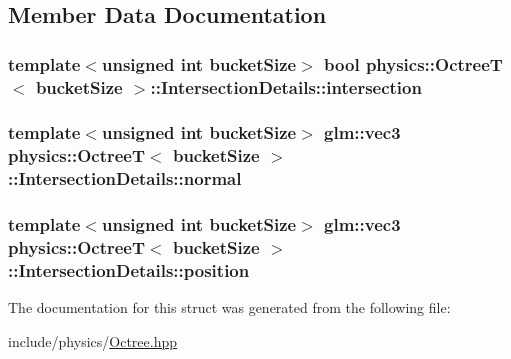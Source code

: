 \subsection{Member Data Documentation}
\hypertarget{structphysics_1_1OctreeT_1_1IntersectionDetails_acd7da41845687dadd2004ab3f849952b}{
\subsubsection[{intersection}]{\setlength{\rightskip}{0pt plus 5cm}template$<$unsigned int bucket\-Size$>$ bool {\bf physics\-::\-Octree\-T}$<$ bucket\-Size $>$\-::Intersection\-Details\-::intersection}}\label{structphysics_1_1OctreeT_1_1IntersectionDetails_acd7da41845687dadd2004ab3f849952b}
\hypertarget{structphysics_1_1OctreeT_1_1IntersectionDetails_a87efb768acda70549ef16a20a5a15681}{
\subsubsection[{normal}]{\setlength{\rightskip}{0pt plus 5cm}template$<$unsigned int bucket\-Size$>$ glm\-::vec3 {\bf physics\-::\-Octree\-T}$<$ bucket\-Size $>$\-::Intersection\-Details\-::normal}}\label{structphysics_1_1OctreeT_1_1IntersectionDetails_a87efb768acda70549ef16a20a5a15681}
\hypertarget{structphysics_1_1OctreeT_1_1IntersectionDetails_a301cd627e77f95090c2aafc202ca9aeb}{
\subsubsection[{position}]{\setlength{\rightskip}{0pt plus 5cm}template$<$unsigned int bucket\-Size$>$ glm\-::vec3 {\bf physics\-::\-Octree\-T}$<$ bucket\-Size $>$\-::Intersection\-Details\-::position}}\label{structphysics_1_1OctreeT_1_1IntersectionDetails_a301cd627e77f95090c2aafc202ca9aeb}


The documentation for this struct was generated from the following file\-:\begin{DoxyCompactItemize}
\item 
include/physics/\hyperlink{Octree_8hpp}{Octree.\-hpp}\end{DoxyCompactItemize}
